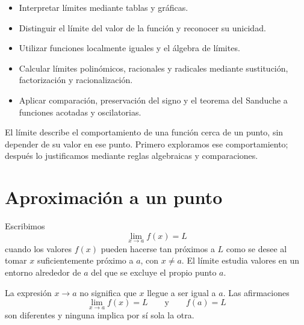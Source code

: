 \documentclass[10pt,a5paper]{article}
\begin{document}

\begin{objetivos}
\begin{itemize}
  \item Interpretar límites mediante tablas y gráficas.
  \item Distinguir el límite del valor de la función y reconocer su unicidad.
  \item Utilizar funciones localmente iguales y el álgebra de límites.
  \item Calcular límites polinómicos, racionales y radicales mediante sustitución, factorización y racionalización.
  \item Aplicar comparación, preservación del signo y el teorema del Sanduche a funciones acotadas y oscilatorias.
\end{itemize}
\end{objetivos}

\begin{resumen}
El límite describe el comportamiento de una función cerca de un punto, sin depender de su valor en ese punto. Primero exploramos ese comportamiento; después lo justificamos mediante reglas algebraicas y comparaciones. 
\end{resumen}

\section*{Aproximación a un punto}

\begin{definicion}
Escribimos
\[
\lim_{x\to a}f(x)=L
\]
cuando los valores $f(x)$ pueden hacerse tan próximos a $L$ como se desee al tomar $x$ suficientemente próximo a $a$, con $x\neq a$. El límite estudia valores en un entorno alrededor de $a$ del que se excluye el propio punto $a$.
\end{definicion}

\begin{nota}
La expresión $x\to a$ no significa que $x$ llegue a ser igual a $a$. Las afirmaciones
\[
  \lim_{x\to a}f(x)=L
  \qquad\text{y}\qquad
  f(a)=L
\]
son diferentes y ninguna implica por sí sola la otra.
\end{nota}
\end{document}
